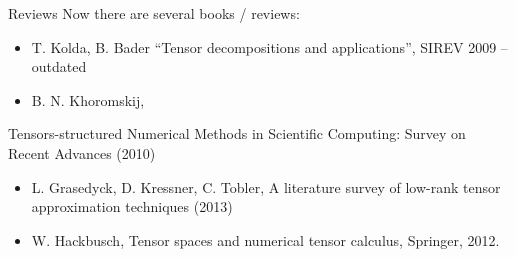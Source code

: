 \documentclass{beamer}[14pt, presentation]
\begin{document}
\begin{frame}[label=sec-1-4]{Reviews}
Now there are several books / reviews: 

\begin{itemize}
\item T. Kolda, B. Bader ``Tensor decompositions and applications'', SIREV
2009 -- outdated
\item B. N. Khoromskij,
\end{itemize}
Tensors-structured Numerical Methods in Scientific Computing: Survey
on Recent Advances (2010)
\begin{itemize}
\item L. Grasedyck, D. Kressner, C. Tobler, A literature survey of
low-rank tensor approximation techniques (2013)
\item W. Hackbusch, Tensor spaces and numerical tensor calculus, Springer, 2012.
\end{itemize}
\end{frame}
\end{document}
